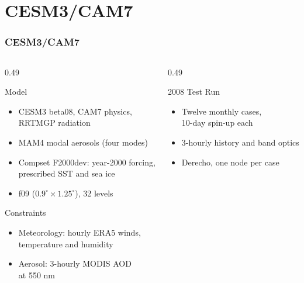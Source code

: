 \section{CESM3/CAM7}
\begin{frame}[t]
\frametitle{CESM3/CAM7}
\footnotesize
\begin{columns}[T]
\begin{column}{0.49\textwidth}
\begin{block}{Model}
\begin{itemize}
  \item CESM3 beta08, CAM7 physics,\\RRTMGP radiation
  \item MAM4 modal aerosols (four modes)
  \item Compset F2000dev: year-2000 forcing,\\prescribed SST and sea ice
  \item f09 ($0.9^\circ \times 1.25^\circ$), 32 levels
\end{itemize}
\end{block}
\begin{block}{Constraints}
\begin{itemize}
  \item Meteorology: hourly ERA5 winds,\\temperature and humidity
  \item Aerosol: 3-hourly MODIS AOD\\at 550 nm
\end{itemize}
\end{block}
\end{column}
\begin{column}{0.49\textwidth}
\begin{block}{2008 Test Run}
\begin{itemize}
  \item Twelve monthly cases,\\10-day spin-up each
  \item 3-hourly history and band optics
  \item Derecho, one node per case
\end{itemize}

\end{block}
\end{column}
\end{columns}
\end{frame}
